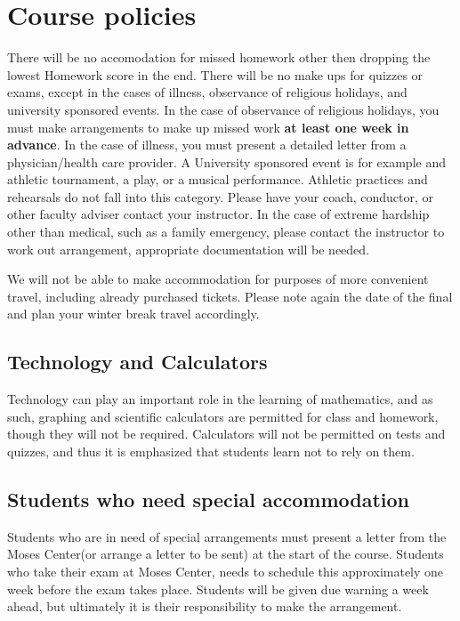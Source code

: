 \documentclass[10pt]{article}
\theoremstyle{definition}
\begin{document}
\section*{Course policies}
There will be no accomodation for missed homework other then dropping the lowest Homework score in the end. There will be no make ups for quizzes or exams, except in the cases of illness, observance of religious holidays, and university sponsored events.  In the case of observance of religious holidays, you must make arrangements to make up missed work \textbf{at least one week in advance}.  In the case of illness, you must present a detailed letter from a physician/health care provider. A University sponsored event is for example and athletic tournament, a play, or a musical performance. Athletic practices and rehearsals do not fall into this category. Please have your coach, conductor, or other faculty adviser contact your instructor. In the case of extreme hardship other than medical, such as a family emergency, please contact the instructor to work out arrangement, appropriate documentation will be needed.

We will not be able to make accommodation for
purposes of more convenient travel, including already purchased tickets. Please note
again the date of the final and plan your winter break travel accordingly.

\subsection*{Technology and Calculators}

Technology can play an important role in the learning of mathematics, and as such,
graphing and scientific calculators are permitted for class and homework, though they will not be
required. Calculators will not be permitted on tests and quizzes, and thus it is emphasized that
students learn not to rely on them.

\subsection*{Students who need special accommodation}

Students who are in need of special arrangements must present a letter from the Moses Center(or arrange a letter to be sent) at the start of the course. Students who take their exam at Moses Center, needs to schedule this approximately one week before the exam takes place. Students will be given due warning a week ahead, but ultimately it is their responsibility to make the arrangement.
\end{document}

